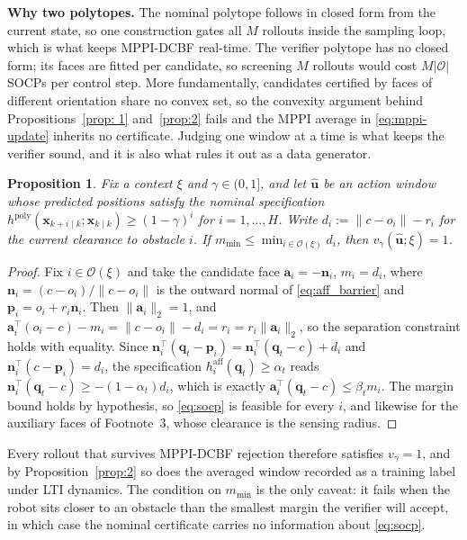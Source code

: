 \documentclass[letterpaper, 10 pt, conference]{ieeeconf}
\newtheorem{proposition}{Proposition}
\newcommand{\p}{\mathbf{p}}
\newcommand{\q}{\mathbf{q}}
\newcommand{\x}{\mathbf{x}}
\newcommand{\xk}{\mathbf{\x}_{k\mid k}}
\newcommand{\xki}{\mathbf{\x}_{k+i\mid k}}
\newcommand{\ai}{\mathbf{a}_{i}}
\begin{document}
{\color{blue}
\noindent \textbf{Why two polytopes.}
The nominal polytope follows in closed form from the current state, so one construction gates all $M$ rollouts inside the sampling loop, which is what keeps MPPI-DCBF real-time. The verifier polytope has no closed form; its faces are fitted per candidate, so screening $M$ rollouts would cost $M|\mathcal O|$ SOCPs per control step. More fundamentally, candidates certified by faces of different orientation share no convex set, so the convexity argument behind Propositions~\ref{prop: 1} and~\ref{prop:2} fails and the MPPI average in \eqref{eq:mppi-update} inherits no certificate. Judging one window at a time is what keeps the verifier sound, and it is also what rules it out as a data generator.
}

{\color{blue}
\begin{proposition} \label{prop: 3}
Fix a context $\xi$ and $\gamma\in(0,1]$, and let $\hat{\mathbf u}$ be an action window whose predicted positions satisfy the nominal specification $h^{\text{poly}}(\xki;\xk)\ge(1-\gamma)^i$ for $i=1,\dots,H$. Write $d_i:=\|c-o_i\|-r_i$ for the current clearance to obstacle $i$. If $m_{\min}\le\min_{i\in\mathcal O(\xi)}d_i$, then $v_\gamma(\hat{\mathbf u};\xi)=1$.
\end{proposition}

\begin{proof}
Fix $i\in\mathcal O(\xi)$ and take the candidate face $\ai=-\mathbf n_i$, $m_i=d_i$, where $\mathbf n_i=(c-o_i)/\|c-o_i\|$ is the outward normal of \eqref{eq:aff_barrier} and $\p_i=o_i+r_i\mathbf n_i$. Then $\|\ai\|_2=1$, and
$\ai^\top(o_i-c)-m_i=\|c-o_i\|-d_i=r_i=r_i\|\ai\|_2$,
so the separation constraint holds with equality. Since $\mathbf n_i^\top(\q_t-\p_i)=\mathbf n_i^\top(\q_t-c)+d_i$ and $\mathbf n_i^\top(c-\p_i)=d_i$, the specification $h^{\mathrm{aff}}_i(\q_t)\ge\alpha_t$ reads $\mathbf n_i^\top(\q_t-c)\ge-(1-\alpha_t)d_i$, which is exactly $\ai^\top(\q_t-c)\le\beta_t m_i$. The margin bound holds by hypothesis, so \eqref{eq:socp} is feasible for every $i$, and likewise for the auxiliary faces of Footnote~3, whose clearance is the sensing radius.
\end{proof}

Every rollout that survives MPPI-DCBF rejection therefore satisfies $v_\gamma=1$, and by Proposition~\ref{prop:2} so does the averaged window recorded as a training label under LTI dynamics. The condition on $m_{\min}$ is the only caveat: it fails when the robot sits closer to an obstacle than the smallest margin the verifier will accept, in which case the nominal certificate carries no information about \eqref{eq:socp}.
}
\end{document}
